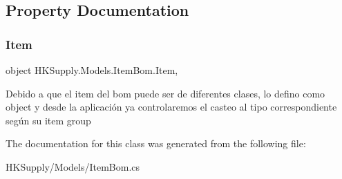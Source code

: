 \subsection{Property Documentation}
\mbox{\label{class_h_k_supply_1_1_models_1_1_item_bom_aaab4813abbe46311b7a983a01f6d2b9a}} 
\subsubsection{\texorpdfstring{Item}{Item}}
{\footnotesize\ttfamily object H\+K\+Supply.\+Models.\+Item\+Bom.\+Item\hspace{0.3cm}{\ttfamily [get]}, {\ttfamily [set]}}



Debido a que el item del bom puede ser de diferentes clases, lo defino como object y desde la aplicación ya controlaremos el casteo al tipo correspondiente según su item group 



The documentation for this class was generated from the following file\+:\begin{DoxyCompactItemize}
\item 
H\+K\+Supply/\+Models/Item\+Bom.\+cs\end{DoxyCompactItemize}
